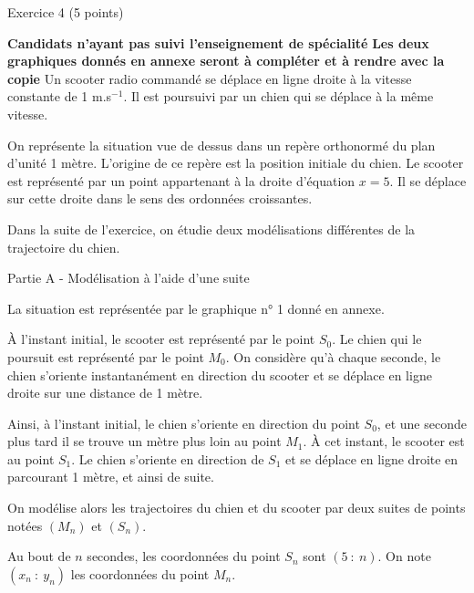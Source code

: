 
%
\begin{h2}Exercice 4 (5 points)\end{h2}
\textbf{Candidats n'ayant pas suivi l'enseignement de spécialité}
\medskip
\textbf{Les deux graphiques donnés en annexe seront à compléter et à rendre avec la copie}
\medskip
Un scooter radio commandé se déplace en ligne droite à la vitesse constante de 1 m.s$^{-1}$. Il est poursuivi
par un chien qui se déplace à la même vitesse.
\par
On représente la situation vue de dessus dans un repère orthonormé du plan d'unité 1 mètre. L'origine de ce repère est la position initiale du chien. Le scooter est représenté par un point appartenant à la droite d'équation $x = 5$. Il se déplace sur cette droite dans le sens des ordonnées croissantes.
\par
\smallskip
\par
Dans la suite de l'exercice, on étudie deux modélisations différentes de la trajectoire du chien.
\bigskip
\begin{center}\begin{h3}Partie A - Modélisation à l'aide d'une suite \end{h3}\end{center}
\medskip
La situation est représentée par le graphique n° 1 donné en annexe.
\par
À l'instant initial, le scooter est représenté par le point $S_0$. Le chien qui le poursuit est représenté
par le point $M_0$. On considère qu'à chaque seconde, le chien s'oriente instantanément en direction
du scooter et se déplace en ligne droite sur une distance de 1 mètre.
\par
Ainsi, à l'instant initial, le chien s'oriente en direction du point $S_0$, et une seconde plus tard il se
trouve un mètre plus loin au point $M_1$. À cet instant, le scooter est au point $S_1$. Le chien s'oriente
en direction de $S_1$ et se déplace en ligne droite en parcourant 1 mètre, et ainsi de suite.
\par
On modélise alors les trajectoires du chien et du scooter par deux suites de points notées $\left(M_n\right)$ et $\left(S_n\right)$.
\par
Au bout de $n$ secondes, les coordonnées du point $S_n$ sont $(5~:~n)$. On note $\left(x_n~:~y_n\right)$ les coordonnées du point $M_n$.
\medskip
